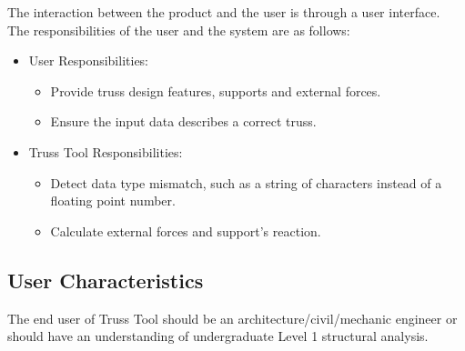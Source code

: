 \documentclass[12pt]{article}
\begin{document}
The interaction between the product and the user is through a user interface. The responsibilities of the user and the system are as follows:
\begin{itemize}
\item User Responsibilities:
\begin{itemize}
\item Provide truss design features, supports and external forces. 
\item Ensure the input data describes a correct truss.

\end{itemize}
\item Truss Tool Responsibilities:
\begin{itemize}
\item Detect data type mismatch, such as a string of characters instead of a  floating point number.
\item Calculate external forces and support's reaction.
\end{itemize}
\end{itemize}


\subsection{User Characteristics} \label{SecUserCharacteristics}

The end user of Truss Tool should be an architecture/civil/mechanic engineer or should have an understanding of undergraduate Level 1 structural analysis.
\end{document}
